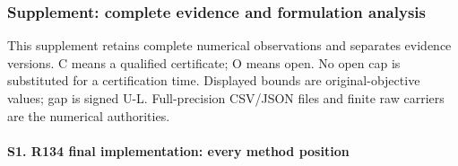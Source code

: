\documentclass[
  american,
  11pt,
]{article}
\begin{document}
\subsubsection{Supplement: complete evidence and formulation
analysis}\label{supplement-complete-evidence-and-formulation-analysis}

This supplement retains complete numerical observations and separates
evidence versions. C means a qualified certificate; O means open. No
open cap is substituted for a certification time. Displayed bounds are
original-objective values; gap is signed U-L. Full-precision CSV/JSON
files and finite raw carriers are the numerical authorities.

\begin{landscape}

\paragraph{S1. R134 final implementation: every method
position}\label{s1.-r134-final-implementation-every-method-position}


\end{landscape}
\end{document}
